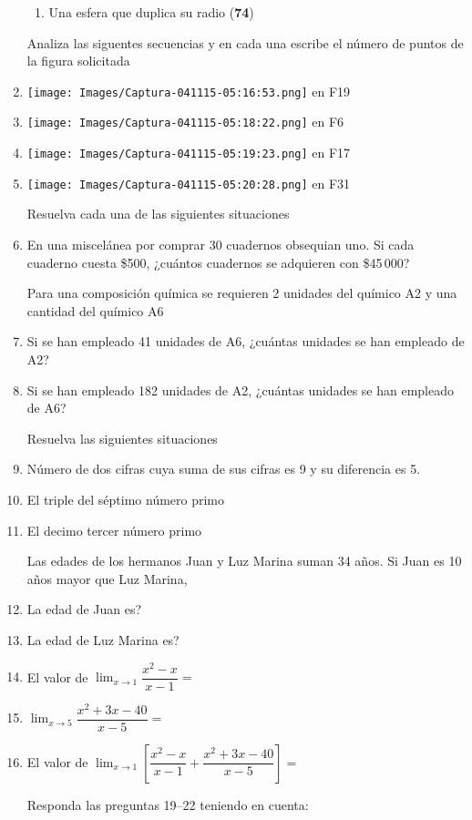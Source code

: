 \documentclass[letterpaper,twoside]{article}
\begin{document}
\begin{multicols}{2}
\begin{enumerate}
\begin{enumerate}
\item Una esfera que duplica su radio (\textbf{74})
\end{enumerate}
Analiza las siguentes secuencias y en cada una escribe el número de puntos de la figura solicitada
\item \texttt{[image: Images/Captura-041115-05:16:53.png]} en F19
\item \texttt{[image: Images/Captura-041115-05:18:22.png]} en F6
\item \texttt{[image: Images/Captura-041115-05:19:23.png]} en F17
\item \texttt{[image: Images/Captura-041115-05:20:28.png]} en F31

Resuelva cada una de las siguientes situaciones
\item En una miscelánea por comprar 30 cuadernos obsequian uno. Si cada cuaderno cuesta \$500, ¿cuántos cuadernos se adquieren con \$45\,000?

Para una composición química se requieren 2 unidades del químico A2 y una cantidad del químico A6
\item Si se han empleado 41 unidades de A6, ¿cuántas unidades se han empleado de A2?
\item Si se han empleado 182 unidades de A2, ¿cuántas unidades se han empleado de A6?

Resuelva las siguientes situaciones
\item Número de dos cifras cuya suma de sus cifras es 9 y su diferencia es 5.
\item El triple del séptimo número primo
\item El decimo tercer número primo

Las edades de los hermanos Juan y Luz Marina suman 34 años. Si Juan es 10 años mayor que Luz Marina, 
\item La edad de Juan es?
\item La edad de Luz Marina es?
\item El valor de $\displaystyle{\lim_{x\rightarrow 1}\dfrac{x^{2}-x}{x-1}}=$
\item $\displaystyle{\lim_{x\rightarrow 5}\dfrac{x^{2}+3x-40}{x-5}}=$
\item El valor de $\displaystyle{\lim_{x\rightarrow 1}\left[\dfrac{x^{2}-x}{x-1}+\dfrac{x^{2}+3x-40}{x-5}\right]}=$

Responda las preguntas 19--22 teniendo en cuenta:


\end{enumerate}
\end{multicols}
\end{document}
